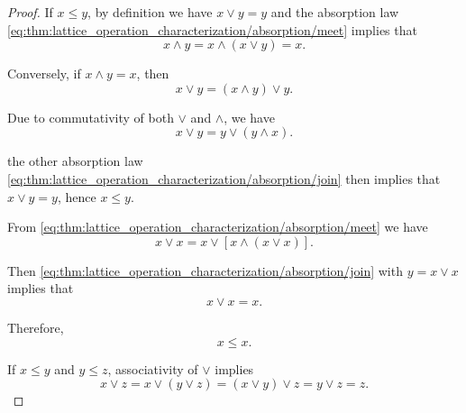 \begin{proof}
   If \( x \leq y \), by definition we have \( x \vee y = y \) and the absorption law \eqref{eq:thm:lattice_operation_characterization/absorption/meet} implies that
  \begin{equation*}
    x \wedge y = x \wedge (x \vee y) = x.
  \end{equation*}

   Conversely, if \( x \wedge y = x \), then
  \begin{equation*}
    x \vee y = (x \wedge y) \vee y.
  \end{equation*}

  Due to commutativity of both \( \vee \) and \( \wedge \), we have
  \begin{equation*}
    x \vee y = y \vee (y \wedge x).
  \end{equation*}

  the other absorption law \eqref{eq:thm:lattice_operation_characterization/absorption/join} then implies that \( x \vee y = y \), hence \( x \leq y \).


   From \eqref{eq:thm:lattice_operation_characterization/absorption/meet} we have
  \begin{equation*}
    x \vee x = x \vee [x \wedge (x \vee x)].
  \end{equation*}

  Then \eqref{eq:thm:lattice_operation_characterization/absorption/join} with \( y = x \vee x \) implies that
  \begin{equation*}
    x \vee x = x.
  \end{equation*}

  Therefore,
  \begin{equation*}
    x \leq x.
  \end{equation*}

   If \( x \leq y \) and \( y \leq z \), associativity of \( \vee \) implies
  \begin{equation*}
    x \vee z = x \vee (y \vee z) = (x \vee y) \vee z = y \vee z = z.
  \end{equation*}


\end{proof}
